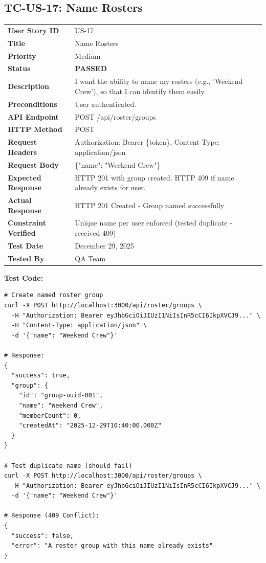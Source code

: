 \documentclass[11pt,a4paper]{article}
\newcommand{\passed}{\textcolor{pass}{\textbf{PASSED}}}
\begin{document}
\vspace{0.5cm}


\subsection{TC-US-17: Name Rosters}

\begin{tabularx}{\textwidth}{|p{3.2cm}|Y|}
\hline
{}
 \\
\hline
\textbf{User Story ID} & US-17 \\
\hline
\textbf{Title} & Name Rosters \\
\hline
\textbf{Priority} & Medium \\
\hline
\textbf{Status} & \passed \\
\hline
\textbf{Description} & I want the ability to name my rosters (e.g., 'Weekend Crew'), so that I can identify them easily. \\
\hline
\textbf{Preconditions} & User authenticated. \\
\hline
\textbf{API Endpoint} & POST /api/roster/groups \\
\hline
\textbf{HTTP Method} & POST \\
\hline
\textbf{Request Headers} & Authorization: Bearer \{token\}, Content-Type: application/json \\
\hline
\textbf{Request Body} & \{"name": "Weekend Crew"\} \\
\hline
\textbf{Expected Response} & HTTP 201 with group created. HTTP 409 if name already exists for user. \\
\hline
\textbf{Actual Response} & HTTP 201 Created - Group named successfully \\
\hline
\textbf{Constraint Verified} & Unique name per user enforced (tested duplicate - received 409) \\
\hline
\textbf{Test Date} & December 29, 2025 \\
\hline
\textbf{Tested By} & QA Team \\
\hline
\end{tabularx}

\vspace{0.3cm}
\textbf{Test Code:}
\begin{lstlisting}
# Create named roster group
curl -X POST http://localhost:3000/api/roster/groups \
  -H "Authorization: Bearer eyJhbGciOiJIUzI1NiIsInR5cCI6IkpXVCJ9..." \
  -H "Content-Type: application/json" \
  -d '{"name": "Weekend Crew"}'

# Response:
{
  "success": true,
  "group": {
    "id": "group-uuid-001",
    "name": "Weekend Crew",
    "memberCount": 0,
    "createdAt": "2025-12-29T10:40:00.000Z"
  }
}

# Test duplicate name (should fail)
curl -X POST http://localhost:3000/api/roster/groups \
  -H "Authorization: Bearer eyJhbGciOiJIUzI1NiIsInR5cCI6IkpXVCJ9..." \
  -d '{"name": "Weekend Crew"}'

# Response (409 Conflict):
{
  "success": false,
  "error": "A roster group with this name already exists"
}
\end{lstlisting}
\end{document}
